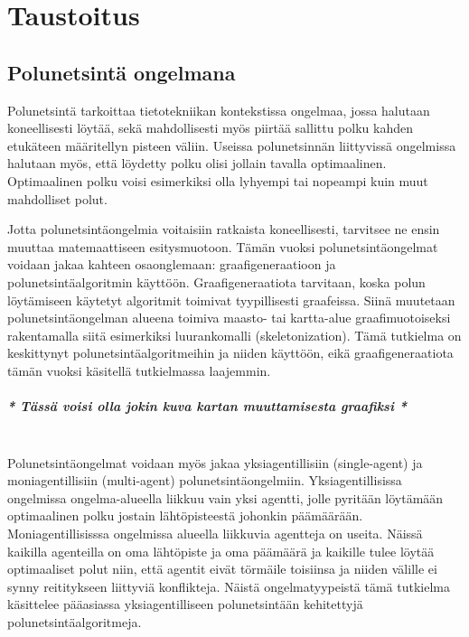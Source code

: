\chapter{Taustoitus} \label{Taustoitus}

\section{Polunetsintä ongelmana}\label{pOngelmana}
Polunetsintä tarkoittaa tietotekniikan kontekstissa ongelmaa, jossa halutaan 
koneellisesti löytää, sekä mahdollisesti myös piirtää sallittu polku kahden 
etukäteen määritellyn pisteen väliin. Useissa polunetsinnän liittyvissä 
ongelmissa halutaan myös, että löydetty polku olisi jollain tavalla 
optimaalinen. Optimaalinen polku voisi esimerkiksi olla lyhyempi tai nopeampi 
kuin muut mahdolliset polut. \cite{MathewAndMalathy} \par
	Jotta polunetsintäongelmia voitaisiin ratkaista koneellisesti, 
tarvitsee ne ensin muuttaa matemaattiseen esitysmuotoon. Tämän vuoksi 
polunetsintäongelmat voidaan jakaa kahteen osaonglemaan: graafigeneraatioon 
ja polunetsintäalgoritmin käyttöön. Graafigeneraatiota tarvitaan, koska polun 
löytämiseen käytetyt algoritmit toimivat tyypillisesti graafeissa. Siinä 
muutetaan polunetsintäongelman alueena toimiva maasto- tai kartta-alue 
graafimuotoiseksi rakentamalla siitä esimerkiksi luurankomalli 
(skeletonization). \cite{ACMHindawi} Tämä tutkielma on keskittynyt 
polunetsintäalgoritmeihin ja niiden käyttöön, eikä graafigeneraatiota tämän 
vuoksi käsitellä tutkielmassa laajemmin.
\\
\paragraph{\textit{* Tässä voisi olla jokin kuva kartan muuttamisesta graafiksi *}}\mbox{}
\\
	Polunetsintäongelmat voidaan myös jakaa yksiagentillisiin 
(single-agent) ja moniagentillisiin (multi-agent) polunetsintäongelmiin. 
Yksiagentillisissa ongelmissa ongelma-alueella liikkuu vain yksi agentti, 
jolle pyritään löytämään optimaalinen polku jostain lähtöpisteestä johonkin 
päämäärään. Moniagentillisisssa ongelmissa alueella liikkuvia agentteja on 
useita. Näissä kaikilla agenteilla on oma lähtöpiste ja oma päämäärä ja 
kaikille tulee löytää optimaaliset polut niin, että agentit eivät törmäile 
toisiinsa ja niiden välille ei synny reititykseen liittyviä konflikteja. 
\cite{arXivMAPF} Näistä ongelmatyypeistä tämä tutkielma käsittelee 
pääasiassa yksiagentilliseen polunetsintään kehitettyjä 
polunetsintäalgoritmeja.

